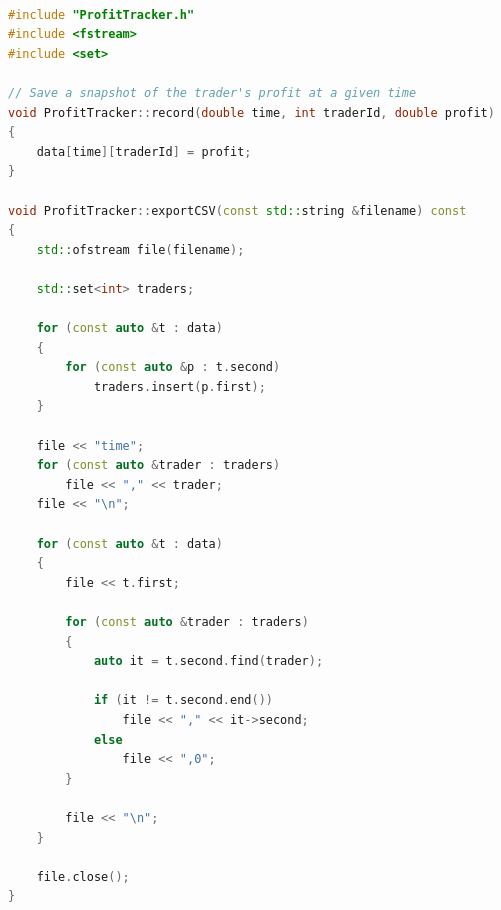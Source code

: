 \documentclass[11pt, a4paper]{article}
\begin{document}
\begin{tcolorbox}[codefile, title={\texttt{ProfitTracker.cpp}}]
\begin{lstlisting}[language=C++, numbers=none, caption={}]

#include "ProfitTracker.h"
#include <fstream>
#include <set>

// Save a snapshot of the trader's profit at a given time
void ProfitTracker::record(double time, int traderId, double profit)
{
    data[time][traderId] = profit;
}

void ProfitTracker::exportCSV(const std::string &filename) const
{
    std::ofstream file(filename);

    std::set<int> traders;

    for (const auto &t : data)
    {
        for (const auto &p : t.second)
            traders.insert(p.first);
    }

    file << "time";
    for (const auto &trader : traders)
        file << "," << trader;
    file << "\n";

    for (const auto &t : data)
    {
        file << t.first;

        for (const auto &trader : traders)
        {
            auto it = t.second.find(trader);

            if (it != t.second.end())
                file << "," << it->second;
            else
                file << ",0";
        }

        file << "\n";
    }

    file.close();
}

\end{lstlisting}
\end{tcolorbox}

\vspace{0.6em}
\end{document}
